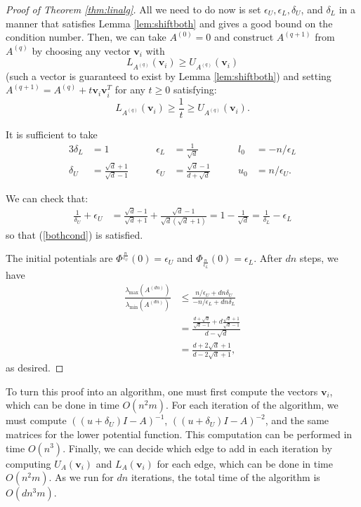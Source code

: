 \documentclass[12pt]{article}
\def\bigO#1{{{O}}\left( #1 \right) }
\newcommand{\lmin}{\lambda_\mathrm{min}}
\newcommand{\lmax}{\lambda_\mathrm{max}}
\newcommand{\deltaL}{\delta_{L}}
\newcommand{\deltaU}{\delta_{U}}
\newcommand{\epsL}{\epsilon_{L}}
\newcommand{\epsU}{\epsilon_{U}}
\newcommand\ppi{\mathbf{v}}
\begin{document}
\begin{proof}[Proof of Theorem \ref{thm:linalg}] All we need to do now is set $\epsU, \epsL, \deltaU$,
and $\deltaL$ in a manner that satisfies Lemma \ref{lem:shiftboth} and gives a good
bound on the condition number. Then, we can take $A^{(0)}=0$ and 
construct $A^{(q+1)}$ from $A^{(q)}$ by choosing any vector $\ppi_{i}$ with
\[ L_{A^{(q)}}(\ppi_{i})\ge U_{A^{(q)}}(\ppi_{i})\] (such a vector is guaranteed to exist by Lemma
\ref{lem:shiftboth})
and setting $A^{(q+1)}=A^{(q)}+t\ppi_{i}\ppi_{i}^{T} $ for any $t\ge 0$ satisfying:
\[ L_{A^{(q)}}(\ppi_{i})\ge\frac{1}{t}\ge U_{A^{(q)}}(\ppi_{i}).\]

It is sufficient to take
\begin{alignat*}{3}
\deltaL  & = 1 \qquad 
& \epsL  & = \frac{1}{\sqrt{d}} \qquad 
& l_{0} & = -n / \epsL\\
\deltaU & = \frac{\sqrt{d} + 1}{\sqrt{d}-1} \qquad 
& \epsU & = \frac{\sqrt{d} - 1}{d + \sqrt{d}} \qquad 
& u_{0} & = n/\epsU.
\end{alignat*}

We can check that:
\begin{align*}
\frac{1}{\deltaU}+\epsU &=
  \frac{\sqrt{d}-1}{\sqrt{d}+1} + \frac{\sqrt{d}-1}{\sqrt{d} (\sqrt{d}+1)}
 = 1 - \frac{1}{\sqrt{d}}
 =\frac{1}{\deltaL}-\epsL
\end{align*}
so that (\ref{bothcond}) is satisfied.

The initial potentials are
$\Phi^{\frac{n}{\epsU}}(0) = \epsU$ and
$\Phi_{\frac{n}{\epsL}}(0)= \epsL$. After $dn$
steps, we have
\begin{align*}
\frac{\lmax(A^{(dn)})}{\lmin(A^{(dn)})}&\le
\frac{n/\epsU+dn\deltaU}{-n/\epsL+dn\deltaL}
 \\&= \frac{
        \frac{d + \sqrt{d}}{\sqrt{d}-1} + d\frac{\sqrt{d}+1}{\sqrt{d}-1}
      }{
        d - \sqrt{d}
      }
\\&= \frac{d+2\sqrt{d}+1}{d-2\sqrt{d}+1},
\end{align*}
as desired. 
\end{proof}

To turn this proof into an algorithm, one must first compute the vectors $\ppi_{i}$,
  which can be done in time $\bigO{n^{2} m}$.
For each iteration of the algorithm, we must compute 
  $((u + \deltaU)I - A)^{-1}$,  $((u + \deltaU)I - A)^{-2}$,
  and the same matrices for the lower potential function.
This computation can be performed in time $\bigO{n^{3}}$.
Finally, we can decide which edge to add in each iteration by computing
  $U_{A} (\ppi_{i})$ and $L_{A} (\ppi_{i})$ for each edge, which can be done
  in time $\bigO{n^{2} m}$.
As we run for $d n$ iterations, the total time of the algorithm is
  $\bigO{d n^{3} m}$.
\end{document}
